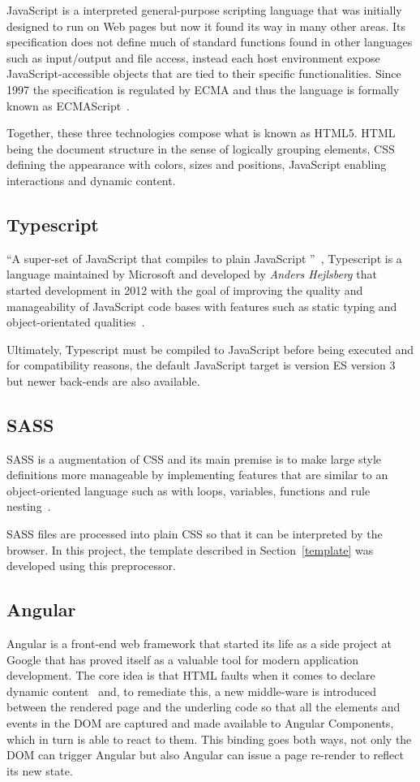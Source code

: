 JavaScript is a interpreted general-purpose scripting language that was initially designed to run on Web pages but now it found its way in many other areas\cite{js}. Its specification does not define much of standard functions found in other languages such as input/output and file access, instead each host environment expose JavaScript-accessible objects that are tied to their specific functionalities. Since 1997 the specification is regulated by \gls{ECMA} and thus the language is formally known as ECMAScript~\cite{ecma}.

Together, these three technologies compose what is known as \gls{HTML}5. \gls{HTML} being the document structure in the sense of logically grouping elements, \gls{CSS} defining the appearance with colors, sizes and positions, JavaScript enabling interactions and dynamic content.

\subsection{Typescript}
``A super-set of JavaScript that compiles to plain JavaScript ''~\cite{tswebsite}, Typescript is a language maintained by Microsoft and developed by \textit{Anders Hejlsberg} that started development in 2012 with the goal of improving the quality and manageability of JavaScript code bases with features such as static typing and object-orientated qualities~\cite{tsrevealed}.

Ultimately, Typescript must be compiled to JavaScript before being executed and for compatibility reasons, the default JavaScript target is version \gls{ES} version 3 but newer back-ends are also available.

\subsection{SASS}
\gls{SASS} is a augmentation of CSS and its main premise is to make large style definitions more manageable by implementing features that are similar to an object-oriented language such as  with loops, variables, functions and rule nesting~\cite{sass}. 

\gls{SASS} files are processed into plain \gls{CSS} so that it can be interpreted by the browser. In this project, the template described in Section~\ref{template} was developed using this preprocessor.

\subsection{Angular}\label{concept:angular}
Angular is a front-end web framework that started its life as a side project at Google that has proved itself as a valuable tool for modern application development. The core idea is that \gls{HTML} faults when it comes to declare dynamic content~\cite{angularjs} and, to remediate this, a new middle-ware is introduced between the rendered page and the underling code so that all the elements and events in the \gls{DOM} are captured and made available to Angular Components, which in turn is able to react to them. This binding goes both ways, not only the \gls{DOM} can trigger Angular but also Angular can issue a page re-render to reflect its new state.

